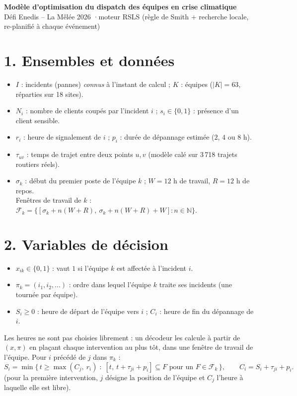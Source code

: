 \documentclass[10pt,a4paper]{article}
\begin{document}
\begin{center}
{\Large\bfseries Modèle d'optimisation du dispatch des équipes en crise climatique}\\[2pt]
{\small Défi Enedis -- La Mêlée 2026 \quad·\quad moteur RSLS (règle de Smith + recherche locale, re-planifié à chaque événement)}
\end{center}

\section*{1. Ensembles et données}
\begin{itemize}
  \item $I$ : incidents (pannes) \emph{connus} à l'instant de calcul ; $K$ : équipes ($|K| = 63$, réparties sur 18 sites).
  \item $N_i$ : nombre de clients coupés par l'incident $i$ ; $s_i \in \{0,1\}$ : présence d'un client sensible.
  \item $r_i$ : heure de signalement de $i$ ; $p_i$ : durée de dépannage estimée ($2$, $4$ ou $8$ h).
  \item $\tau_{uv}$ : temps de trajet entre deux points $u,v$ (modèle calé sur 3\,718 trajets routiers réels).
  \item $\sigma_k$ : début du premier poste de l'équipe $k$ ; $W = 12$ h de travail, $R = 12$ h de repos.\\
        Fenêtres de travail de $k$ : $\mathcal{F}_k = \{[\sigma_k + n(W{+}R),\ \sigma_k + n(W{+}R) + W] : n \in \mathbb{N}\}$.
\end{itemize}

\section*{2. Variables de décision}
\begin{itemize}
  \item $x_{ik} \in \{0,1\}$ : vaut $1$ si l'équipe $k$ est affectée à l'incident $i$.
  \item $\pi_k = (i_1, i_2, \dots)$ : ordre dans lequel l'équipe $k$ traite ses incidents (une tournée par équipe).
  \item $S_i \ge 0$ : heure de départ de l'équipe vers $i$ ; \quad $C_i$ : heure de fin du dépannage de $i$.
\end{itemize}
Les heures ne sont pas choisies librement : un décodeur les calcule à partir de $(x,\pi)$ en plaçant chaque intervention
au plus tôt, dans une fenêtre de travail de l'équipe. Pour $i$ précédé de $j$ dans $\pi_k$ :
\[
S_i = \min\{\, t \ge \max(C_j,\ r_i) \;:\; [t,\ t + \tau_{ji} + p_i] \subseteq F \text{ pour un } F \in \mathcal{F}_k \,\},
\qquad C_i = S_i + \tau_{ji} + p_i .
\]
(pour la première intervention, $j$ désigne la position de l'équipe et $C_j$ l'heure à laquelle elle est libre).
\end{document}
